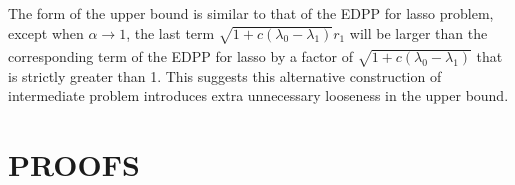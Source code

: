 The form of the upper bound is similar to that of the EDPP for lasso problem, except when $\alpha\xrightarrow[]{}1$, the last term $\sqrt{1+c(\lambda_0-\lambda_1)}r_1$ will be larger than the corresponding term of the EDPP for lasso by a factor of $\sqrt{1+c(\lambda_0-\lambda_1)}$ that is strictly greater than 1. This suggests this alternative construction of intermediate problem introduces extra unnecessary looseness in the upper bound.

\renewcommand{\thechapter}{\Alph{chapter}}
\chapter{PROOFS}
\section{}


\doublespace
